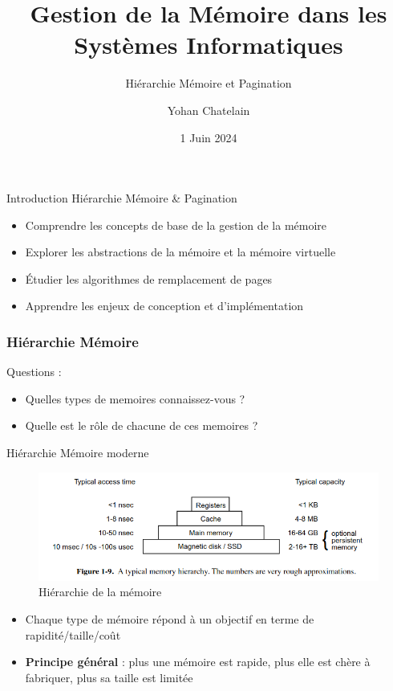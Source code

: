 \documentclass{beamer}
\title{Gestion de la Mémoire dans les Systèmes Informatiques}
\subtitle{Hiérarchie Mémoire et Pagination}
\author{Yohan Chatelain}
\institute{Polytechnique Montr\'eal}
\date{1 Juin 2024}
\begin{document}
\begin{frame}
    \titlepage
\end{frame}

\begin{frame}{Introduction}
         Hiérarchie Mémoire \& Pagination
\begin{itemize}
    \item Comprendre les concepts de base de la gestion de la mémoire
    \item Explorer les abstractions de la mémoire et la mémoire virtuelle
    \item Étudier les algorithmes de remplacement de pages
    \item Apprendre les enjeux de conception et d'implémentation
\end{itemize}

\end{frame}

\begin{frame}
\frametitle{Hiérarchie Mémoire}


Questions :
\begin{itemize}
    \item Quelles types de memoires connaissez-vous ?
    \item Quelle est le r\^ole de chacune de ces memoires ?
\end{itemize}
\end{frame}

\begin{frame}{Hiérarchie Mémoire moderne}
\begin{figure}
    \centering
    \includegraphics[width=\textwidth]{figures/memory_speed.png}
    \caption{Hiérarchie de la mémoire \cite{tanenbaum2009modern}}
    \label{fig:enter-label}
\end{figure}

\begin{itemize}
    \item Chaque type de m\'emoire r\'epond \`a un objectif en terme de rapidit\'e/taille/co\^ut
    \item \textbf{Principe général} : plus une m\'emoire est rapide, plus elle est ch\`ere \`a fabriquer, plus sa taille est limit\'ee
\end{itemize}

\end{frame}
\end{document}
